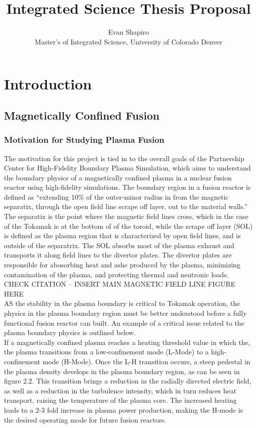 \documentclass{article}
\title{Integrated Science Thesis Proposal}
\author{Evan Shapiro \\ Master's of Integrated Science, University of Colorado Denver}
\begin{document}
\maketitle
\tableofcontents
\section{Introduction}
\subsection{Magnetically Confined Fusion}
\subsubsection{Motivation for Studying Plasma Fusion}

The motivation for this project is tied in to the overall goals of the Partnership Center for High-Fidelity Boundary Plasma Simulation, which aims to understand the boundary physics of a magnetically confined plasma in a nuclear fusion reactor using high-fidelity simulations. The boundary region in a fusion reactor is defined as “extending 10\% of the outer-minor radius in from the magnetic separatix, through the open field line scrape off layer, out to the material walls.” The separatix is the point where the magnetic field lines cross, which in the case of the Tokamak is at the bottom of of the toroid, while the scrape off layer (SOL) is defined as the plasma region that is characterized by open field lines, and is outside of the separatrix. The SOL absorbs most of the plasma exhaust and transports it along field lines to the divertor plates. The divertor plates are responsible for abosorbing heat and ashe produced by the plasma, minimizing contamination of the plasma, and protecting thermal and neutronic loads.\\

CHECK CITATION – INSERT MAIN MAGNETIC FIELD LINE FIGURE HERE\\

AS the stability in the plasma boundary is critical to Tokamak operation, the physics in the plasma boundary region must be better understood before a fully functional fusion reactor can built. An example of a critical issue related to the plasma boundary physics is outlined below.\\

If a magnetically confined plasma reaches a heating threshold value in which the, the plasma transitions from a low-confinement mode (L-Mode) to a high-confinement mode (H-Mode). Once the L-H transition occurs, a steep pedestal in the plasma density develops in the plasma boundary region, as can be seen in figure 2.2. This transition brings a reduction in the radially directed electric field, as well as a reduction in the turbulence intensity, which in turn reduces heat transport, raising the temperature of the plasma core. The increased heating leads to a 2-3 fold increase in plasma power production, making the H-mode is the desired operating mode for future fusion reactors.\\
\end{document}
